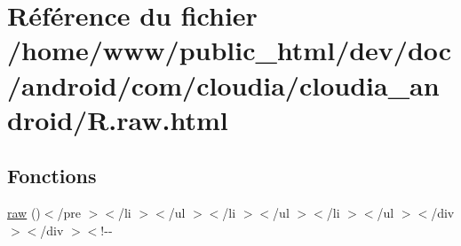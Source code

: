 \hypertarget{_r_8raw_8html}{\section{Référence du fichier /home/www/public\-\_\-html/dev/doc/android/com/cloudia/cloudia\-\_\-android/\-R.raw.\-html}
\label{_r_8raw_8html}
}
\subsection*{Fonctions}
\begin{DoxyCompactItemize}
\item 
\hyperlink{_r_8raw_8html_a4187992652c65c6d88018464824a0cab}{raw} ()$<$/pre $>$$<$/li $>$$<$/ul $>$$<$/li $>$$<$/ul $>$$<$/li $>$$<$/ul $>$$<$/div $>$$<$/div $>$$<$!-\/-\/
\end{DoxyCompactItemize}

